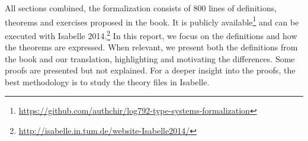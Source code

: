 All sections combined, the formalization consists of 800 lines of definitions, theorems and
exercises proposed in the book. It is publicly
available\footnote{\url{https://github.com/authchir/log792-type-systems-formalization}} and can be
executed with Isabelle 2014.\footnote{\url{http://isabelle.in.tum.de/website-Isabelle2014/}} In this
report, we focus on the definitions and how the theorems are expressed. When relevant, we present
both the definitions from the book and our translation, highlighting and motivating the differences.
Some proofs are presented but not explained. For a deeper insight into the proofs, the best
methodology is to study the theory files in Isabelle.

